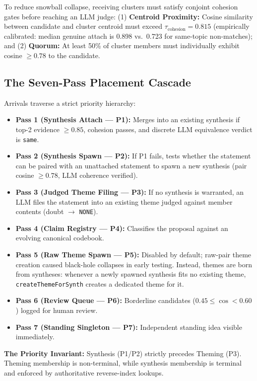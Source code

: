 \documentclass[11pt,a4paper]{article}
\begin{document}
To reduce snowball collapse, receiving clusters must satisfy conjoint cohesion gates before reaching an LLM judge: (1) \textbf{Centroid Proximity:} Cosine similarity between candidate and cluster centroid must exceed $\tau_{\mathrm{cohesion}} = 0.815$ (empirically calibrated: median genuine attach is 0.898 vs.\ 0.723 for same-topic non-matches); and (2) \textbf{Quorum:} At least 50\% of cluster members must individually exhibit cosine $\geq 0.78$ to the candidate.

\subsection{The Seven-Pass Placement Cascade}

Arrivals traverse a strict priority hierarchy:

\begin{itemize}
\item \textbf{Pass 1 (Synthesis Attach --- P1):} Merges into an existing synthesis if top-2 evidence $\geq 0.85$, cohesion passes, and discrete LLM equivalence verdict is \texttt{same}.
\item \textbf{Pass 2 (Synthesis Spawn --- P2):} If P1 fails, tests whether the statement can be paired with an unattached statement to spawn a new synthesis (pair cosine $\geq 0.78$, LLM coherence verified).
\item \textbf{Pass 3 (Judged Theme Filing --- P3):} If no synthesis is warranted, an LLM files the statement into an existing theme judged against member contents (doubt $\rightarrow$ \texttt{NONE}).
\item \textbf{Pass 4 (Claim Registry --- P4):} Classifies the proposal against an evolving canonical codebook.
\item \textbf{Pass 5 (Raw Theme Spawn --- P5):} Disabled by default; raw-pair theme creation caused black-hole collapses in early testing. Instead, themes are born from syntheses: whenever a newly spawned synthesis fits no existing theme, \texttt{createThemeForSynth} creates a dedicated theme for it.
\item \textbf{Pass 6 (Review Queue --- P6):} Borderline candidates ($0.45 \leq \cos < 0.60$) logged for human review.
\item \textbf{Pass 7 (Standing Singleton --- P7):} Independent standing idea visible immediately.
\end{itemize}

\textbf{The Priority Invariant:} Synthesis (P1/P2) strictly precedes Theming (P3). Theming membership is non-terminal, while synthesis membership is terminal and enforced by authoritative reverse-index lookups.
\end{document}
